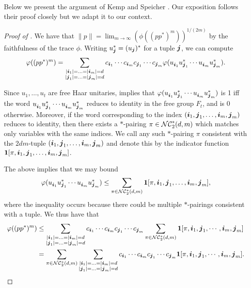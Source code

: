 Below we present the argument of Kemp and Speicher \cite{KS05}. Our exposition follows their proof closely but we adapt it to our context.
\begin{proof}[Proof of ]
     We have that $\|p\| = \lim_{m \to \infty} \left(\phi((pp^*)^m)\right)^{1/(2m)}$ by the faithfulness of the trace $\phi$. Writing $u^*_{\boldsymbol{j}} = (u_{\boldsymbol{j}})^*$ for a tuple ${\boldsymbol{j}}$, we can compute 
    \begin{align*}
         \varphi((pp^*)^m) = \sum_{\substack{|{\boldsymbol{i}}_1|=\ldots=|{\boldsymbol{i}}_m|=d\\|{\boldsymbol{j}}_1|=\ldots=|{\boldsymbol{j}}_m|=d}} c_{{\boldsymbol{i}}_1}\cdots c_{{\boldsymbol{i}}_m}c_{{\boldsymbol{j}}_1}\cdots c_{{\boldsymbol{j}}_m} \varphi(u^{}_{{\boldsymbol{i}}_1}u^*_{{\boldsymbol{j}}_1} \cdots u^{}_{{\boldsymbol{i}}_m}u^*_{{\boldsymbol{j}}_m}).
    \end{align*}
    
    Since $u_1, \ldots, u_t$ are free Haar unitaries,  implies that $\varphi(u^{}_{{\boldsymbol{i}}_1}u^*_{{\boldsymbol{j}}_1} \cdots u^{}_{{\boldsymbol{i}}_m}u^*_{{\boldsymbol{j}}_m})$ is 1 iff the word $u^{}_{{\boldsymbol{i}}_1}u^*_{{\boldsymbol{j}}_1}\cdots u^{}_{{\boldsymbol{i}}_m}u^*_{{\boldsymbol{j}}_m}$ reduces to identity in the free group $F_t$, and is 0 otherwise. Moreover, if the word corresponding to the index $({\boldsymbol{i}}_1,{\boldsymbol{j}}_1, \ldots, {\boldsymbol{i}}_m,{\boldsymbol{j}}_m)$ reduces to identity, then there exists a $*$-pairing $\pi \in \mathcal{NC}_2^*(d,m)$ which matches only variables with the same indices. We call any such $*$-pairing $\pi$ consistent with the $2dm$-tuple $({\boldsymbol{i}}_1,{\boldsymbol{j}}_1, \ldots, {\boldsymbol{i}}_m,{\boldsymbol{j}}_m)$ and denote this by the indicator function $\mathbf{1}[\pi, {\boldsymbol{i}}_1,{\boldsymbol{j}}_1, \ldots, {\boldsymbol{i}}_m,{\boldsymbol{j}}_m]$.
    
    The above implies that we may bound 
    \[ \varphi(u^{}_{{\boldsymbol{i}}_1}u^*_{{\boldsymbol{j}}_1} \cdots u^{}_{{\boldsymbol{i}}_m}u^*_{{\boldsymbol{j}}_m})  \le \sum_{\pi \in \mathcal{NC}^*_2(d,m)} \mathbf{1}[\pi, {\boldsymbol{i}}_1,{\boldsymbol{j}}_1, \ldots, {\boldsymbol{i}}_m,{\boldsymbol{j}}_m],\]
    where the inequality occurs because there could be multiple $*$-pairings consistent with a tuple. We thus have that 
    \begin{align*}
         \varphi((pp^*)^m) &\le \sum_{\substack{|{\boldsymbol{i}}_1|=\ldots=|{\boldsymbol{i}}_m|=d\\|{\boldsymbol{j}}_1|=\ldots=|{\boldsymbol{j}}_m|=d}} c_{{\boldsymbol{i}}_1}\cdots c_{{\boldsymbol{i}}_m}c_{{\boldsymbol{j}}_1}\cdots c_{{\boldsymbol{j}}_m} \sum_{\pi \in \mathcal{NC}^*_2(d,m)} \mathbf{1}[\pi, {\boldsymbol{i}}_1,{\boldsymbol{j}}_1, \cdots, {\boldsymbol{i}}_m,{\boldsymbol{j}}_m]\\
         &= \sum_{\pi \in \mathcal{NC}^*_2(d,m)}  \sum_{\substack{|{\boldsymbol{i}}_1|=\ldots=|{\boldsymbol{i}}_m|=d\\|{\boldsymbol{j}}_1|=\ldots=|{\boldsymbol{j}}_m|=d}} c_{{\boldsymbol{i}}_1}\cdots c_{{\boldsymbol{i}}_m}c_{{\boldsymbol{j}}_1}\cdots c_{{\boldsymbol{j}}_m} \mathbf{1}[\pi, {\boldsymbol{i}}_1,{\boldsymbol{j}}_1, \cdots, {\boldsymbol{i}}_m,{\boldsymbol{j}}_m].
    \end{align*}
    

\end{proof}
